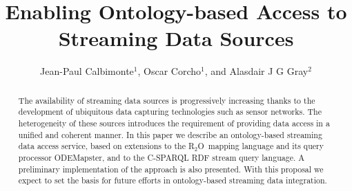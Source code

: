 \documentclass{llncs}
\newcommand{\keywords}[1]{\par\addvspace\baselineskip
\noindent\keywordname\enspace\ignorespaces#1}
\newcommand{\subscript}[1]{\ensuremath{_{\textrm{#1}}}}
\newcommand{\rtwoo}{\textsf{R\subscript{2}O}}
\begin{document}
\makeatletter
\providecommand*{\toclevel@title}{0}
\makeatother

\makeatletter
\providecommand*{\toclevel@author}{1}
\makeatother


\title{Enabling Ontology-based Access to Streaming Data Sources}



%
%
\author{Jean-Paul Calbimonte$^1$, Oscar Corcho$^1$, and Alasdair J G Gray$^2$}
%

%
%

\maketitle

\begin{abstract}
The availability of streaming data sources is progressively increasing thanks to the development of ubiquitous data capturing technologies such as sensor networks. The heterogeneity of these sources introduces the requirement of providing data access in a unified and coherent manner. In this paper we describe an ontology-based streaming data access service, based on extensions to the \rtwoo\ mapping language and its query processor ODEMapster, and to the C-SPARQL RDF stream query language. A preliminary implementation of the approach is also presented. With this proposal we expect to set the basis for future efforts in ontology-based streaming data integration.

\end{abstract}
\end{document}
